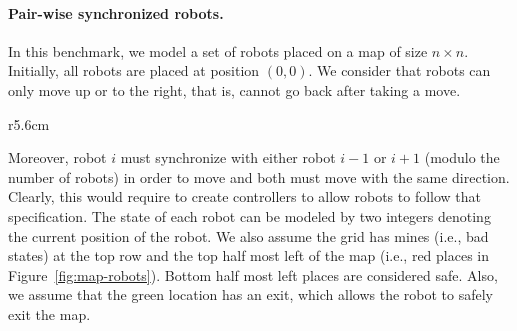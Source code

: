 \paragraph{Pair-wise synchronized robots.} 
In this benchmark, we model a set of robots placed on a map of size $n \times n$. Initially, all robots are placed at position $(0, 0)$. We consider that robots can only move up or to the right, that is, cannot go back after taking a move.
%
\begin{wrapfigure}{r}{5.6cm}
\vspace*{-0.1cm}
\centering
{}
\vspace*{-0.5cm}
\caption{Map of pair-wise synchronizing robots}
\vspace*{-0.5cm}
\label{fig:map-robots}
\end{wrapfigure}
%
Moreover, robot $i$ must synchronize with either robot $i-1$ or $i+1$ (modulo the number of robots) in order to move and both must move with the same direction. Clearly, this would require to create controllers to allow robots to follow that specification. The state of each robot can be modeled by two integers denoting the current position of the robot. We also assume the grid has mines (i.e., bad states) at the top row and the top half most left of the map (i.e., red places in Figure~\ref{fig:map-robots}). 
%
Bottom half most left places are considered safe. Also, we assume that the green location has an exit, which allows the robot to safely exit the map.   


